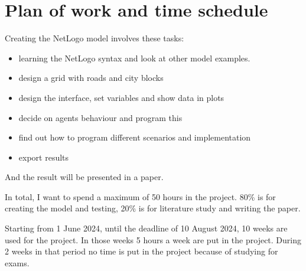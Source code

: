 \section{Plan of work and time schedule}

Creating the NetLogo model involves these tasks:
\begin{itemize}
    \item learning the NetLogo syntax and look at other model examples.
    \item design a grid with roads and city blocks
    \item design the interface, set variables and show data in plots
    \item decide on agents behaviour and program this
    \item find out how to program different scenarios and implementation
    \item export results
\end{itemize}

And the result will be presented in a paper.

In total, I want to spend a maximum of 50 hours in the project.
80\% is for creating the model and testing, 20\% is for literature study and writing the paper.

Starting from 1 June 2024, until the deadline of 10 August 2024, 10 weeks are used for the project.
In those weeks 5 hours a week are put in the project.
During 2 weeks in that period no time is put in the project because of studying for exams.

